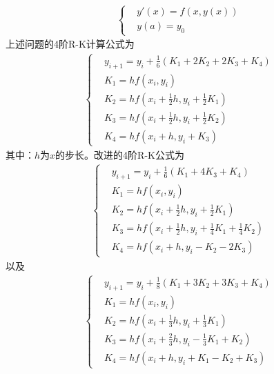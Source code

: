             \begin{align*}
            \left\{
            \begin{aligned}
            & y'(x) = f(x,y(x))\\
            & y(a) = y_0
            \end{aligned}
            \right.
            \end{align*}
            上述问题的4阶R-K计算公式为
            \begin{align*}
            \left\{
            \begin{aligned}
            & y_{i+1} = y_i + \frac{1}{6}(K_1+2K_2+2K_3+K_4)\\
            & K_1 = hf(x_i,y_i)\\
            & K_2 = hf(x_i+\frac{1}{2}h,y_i+\frac{1}{2}K_1)\\
            & K_3 = hf(x_i+\frac{1}{2}h,y_i+\frac{1}{2}K_2)\\
            & K_4 = hf(x_i+h,y_i+K_3)
            \end{aligned}
            \right.
            \end{align*}
            其中：$h$为$x$的步长。改进的4阶R-K公式为
            \begin{align*}
            \left\{
            \begin{aligned}
            & y_{i+1} = y_i + \frac{1}{6}(K_1+4K_3+K_4)\\
            & K_1 = hf(x_i,y_i)\\
            & K_2 = hf(x_i+\frac{1}{2}h,y_i+\frac{1}{2}K_1)\\
            & K_3 = hf(x_i+\frac{1}{2}h,y_i+\frac{1}{4}K_1+\frac{1}{4}K_2)\\
            & K_4 = hf(x_i+h,y_i-K_2-2K_3)
            \end{aligned}
            \right.
            \end{align*}
            以及
            \begin{align*}
            \left\{
            \begin{aligned}
            & y_{i+1} = y_i + \frac{1}{8}(K_1+3K_2+3K_3+K_4)\\
            & K_1 = hf(x_i,y_i)\\
            & K_2 = hf(x_i+\frac{1}{3}h,y_i+\frac{1}{3}K_1)\\
            & K_3 = hf(x_i+\frac{2}{3}h,y_i-\frac{1}{3}K_1+K_2)\\
            & K_4 = hf(x_i+h,y_i+K_1-K_2+K_3)
            \end{aligned}
            \right.
            \end{align*}
